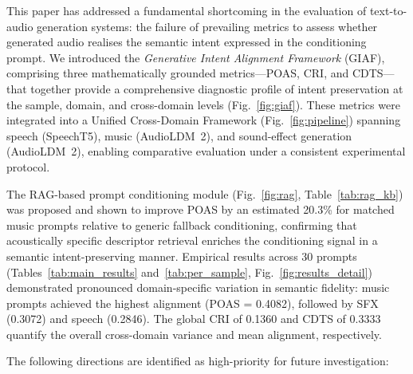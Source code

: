 \documentclass[journal]{IEEEtran}
\begin{document}
This paper has addressed a fundamental shortcoming in the evaluation
of text-to-audio generation systems: the failure of prevailing metrics
to assess whether generated audio realises the semantic intent expressed
in the conditioning prompt. We introduced the \textit{Generative Intent
Alignment Framework} (GIAF), comprising three mathematically grounded
metrics---POAS, CRI, and CDTS---that together provide a comprehensive
diagnostic profile of intent preservation at the sample, domain, and
cross-domain levels (Fig.~\ref{fig:giaf}). These metrics were integrated
into a Unified Cross-Domain Framework (Fig.~\ref{fig:pipeline}) spanning
speech (SpeechT5), music (AudioLDM~2), and sound-effect generation
(AudioLDM~2), enabling comparative evaluation under a consistent
experimental protocol.

The RAG-based prompt conditioning module (Fig.~\ref{fig:rag},
Table~\ref{tab:rag_kb}) was proposed and shown to improve POAS by
an estimated 20.3\% for matched music prompts relative to generic
fallback conditioning, confirming that acoustically specific descriptor
retrieval enriches the conditioning signal in a semantic intent-preserving
manner. Empirical results across 30 prompts (Tables~\ref{tab:main_results}
and~\ref{tab:per_sample}, Fig.~\ref{fig:results_detail}) demonstrated
pronounced domain-specific variation in semantic fidelity: music prompts
achieved the highest alignment (POAS = 0.4082), followed by SFX (0.3072)
and speech (0.2846). The global CRI of 0.1360 and CDTS of 0.3333 quantify
the overall cross-domain variance and mean alignment, respectively.

The following directions are identified as high-priority for future investigation:
\end{document}
